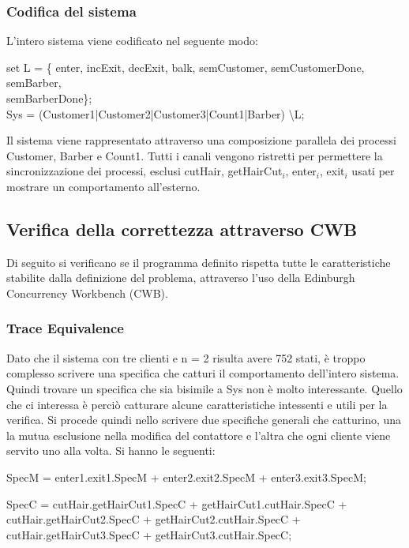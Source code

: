 \subsubsection{Codifica del sistema}

L'intero sistema viene codificato nel seguente modo:

\textsf{set L = \{ enter, incExit, decExit, balk, semCustomer, semCustomerDone, semBarber,\\ semBarberDone\};}\\
\textsf{Sys = (Customer1|Customer2|Customer3|Count1|Barber) \textbackslash L;}

Il sistema viene rappresentato attraverso una composizione parallela dei processi \textsf{Customer, Barber e Count1}. Tutti i canali vengono ristretti per permettere la sincronizzazione dei processi, esclusi \textsf{cutHair, getHairCut$_{i}$, enter$_{i}$, exit$_{i}$} usati per mostrare un comportamento all'esterno.

\subsection{Verifica della correttezza attraverso CWB }

Di seguito si verificano se il programma definito rispetta tutte le caratteristiche stabilite dalla definizione del problema, attraverso l'uso della Edinburgh Concurrency Workbench (CWB).

\subsubsection{Trace Equivalence} 

Dato che il sistema con tre clienti e n = 2 risulta avere 752 stati, è troppo complesso scrivere una specifica che catturi il comportamento dell'intero sistema. Quindi trovare un specifica che sia bisimile a \textsf{Sys} non è molto interessante. Quello che ci interessa è perciò catturare alcune caratteristiche intessenti e utili per la verifica. Si procede quindi nello scrivere due specifiche generali che catturino, una la mutua esclusione nella modifica del contattore e l'altra che ogni cliente viene servito uno alla volta. Si hanno le seguenti:

\textsf{SpecM = enter1.exit1.SpecM + enter2.exit2.SpecM + enter3.exit3.SpecM;}

\textsf{SpecC = cutHair.getHairCut1.SpecC + getHairCut1.cutHair.SpecC + \\cutHair.getHairCut2.SpecC + getHairCut2.cutHair.SpecC + \\cutHair.getHairCut3.SpecC + getHairCut3.cutHair.SpecC;}

